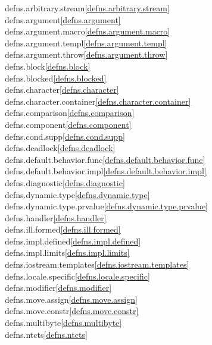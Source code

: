 \begin{multicols}{2}
defns.arbitrary.stream\quad\ref{defns.arbitrary.stream}\\
defns.argument\quad\ref{defns.argument}\\
defns.argument.macro\quad\ref{defns.argument.macro}\\
defns.argument.templ\quad\ref{defns.argument.templ}\\
defns.argument.throw\quad\ref{defns.argument.throw}\\
defns.block\quad\ref{defns.block}\\
defns.blocked\quad\ref{defns.blocked}\\
defns.character\quad\ref{defns.character}\\
defns.character.container\quad\ref{defns.character.container}\\
defns.comparison\quad\ref{defns.comparison}\\
defns.component\quad\ref{defns.component}\\
defns.cond.supp\quad\ref{defns.cond.supp}\\
defns.deadlock\quad\ref{defns.deadlock}\\
defns.default.behavior.func\quad\ref{defns.default.behavior.func}\\
defns.default.behavior.impl\quad\ref{defns.default.behavior.impl}\\
defns.diagnostic\quad\ref{defns.diagnostic}\\
defns.dynamic.type\quad\ref{defns.dynamic.type}\\
defns.dynamic.type.prvalue\quad\ref{defns.dynamic.type.prvalue}\\
defns.handler\quad\ref{defns.handler}\\
defns.ill.formed\quad\ref{defns.ill.formed}\\
defns.impl.defined\quad\ref{defns.impl.defined}\\
defns.impl.limits\quad\ref{defns.impl.limits}\\
defns.iostream.templates\quad\ref{defns.iostream.templates}\\
defns.locale.specific\quad\ref{defns.locale.specific}\\
defns.modifier\quad\ref{defns.modifier}\\
defns.move.assign\quad\ref{defns.move.assign}\\
defns.move.constr\quad\ref{defns.move.constr}\\
defns.multibyte\quad\ref{defns.multibyte}\\
defns.ntcts\quad\ref{defns.ntcts}\\

\end{multicols}
